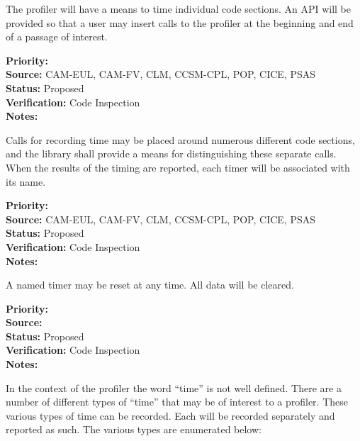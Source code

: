 

The profiler will have a means to time individual code sections.  An API will be 
provided so that a user may insert calls to the profiler at the beginning and
end of a passage of interest.

\begin{reqlist}
{\bf Priority:} \\
{\bf Source:} CAM-EUL, CAM-FV, CLM, CCSM-CPL, POP, CICE, PSAS \\
{\bf Status:} Proposed \\
{\bf Verification:} Code Inspection \\
{\bf Notes:} 
\end{reqlist}


Calls for recording time may be placed around numerous different code sections, 
and the library shall provide a means for distinguishing these separate calls.  When
the results of the timing are reported, each timer will be associated with its name.

\begin{reqlist}
{\bf Priority:} \\
{\bf Source:} CAM-EUL, CAM-FV, CLM, CCSM-CPL, POP, CICE, PSAS \\
{\bf Status:} Proposed \\
{\bf Verification:} Code Inspection \\
{\bf Notes:} 
\end{reqlist}


A named timer may be reset at any time.  All data will be cleared.

\begin{reqlist}
{\bf Priority:} \\
{\bf Source:}  \\
{\bf Status:} Proposed \\
{\bf Verification:} Code Inspection \\
{\bf Notes:} 
\end{reqlist}


In the context of the profiler the word ``time'' is not well defined.  There are
a number of different types of ``time'' that may be of interest to a profiler.
These various types of time can be recorded.  Each will be recorded separately and reported
as such.  The various types are enumerated below:

